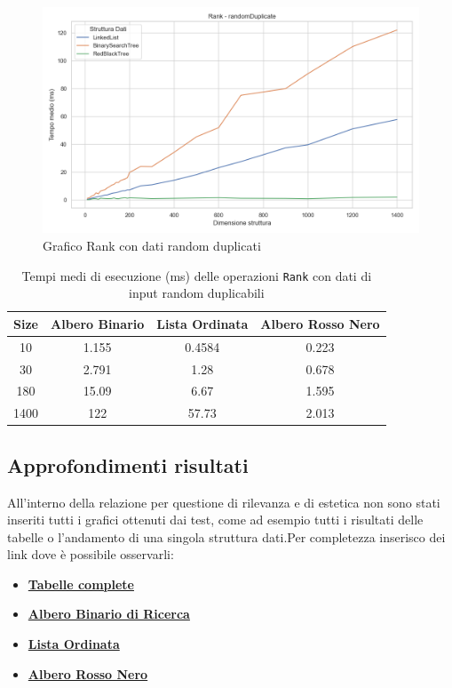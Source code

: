 \documentclass[10pt]{article}
\begin{document}
\begin{figure}
    \centering
    \includegraphics[width=0.8\linewidth]{plots/confronto/randomDuplicate_rank.png}
    \caption{Grafico Rank con dati random duplicati}
    \label{confronto-rank-duplicated}
\end{figure}
\begin{table}[H]
\centering
\begin{tabular}{|c|c|c|c|}
\hline
\textbf{Size} & \textbf{Albero Binario} & \textbf{Lista Ordinata} & \textbf{Albero Rosso Nero} \\
\hline
10     & 1.155 & 0.4584 & 0.223 \\
30     & 2.791 & 1.28  & 0.678 \\
180    & 15.09 & 6.67  & 1.595 \\
1400   & 122 & 57.73  & 2.013 \\
\hline
\end{tabular}
\caption{Tempi medi di esecuzione (ms) delle operazioni \texttt{Rank} con dati di input random duplicabili}
\label{tab:confronto-rank-duplicated}
\end{table}
\subsection{Approfondimenti risultati}
\label{approfondimenti}
All'interno della relazione per questione di rilevanza e di estetica non sono stati inseriti tutti i grafici ottenuti dai test, come ad esempio tutti i risultati delle tabelle o l'andamento di una singola struttura dati.\newline Per completezza inserisco dei link dove è possibile osservarli:
\begin{itemize}
    \item \href{https://github.com/Pennelli02/SelectRankValutation/tree/master/output/plots/table}{\textbf{Tabelle complete}}
    \item \href{https://github.com/Pennelli02/SelectRankValutation/tree/master/output/plots/BinarySearchTree}{\textbf{Albero Binario di Ricerca}}
    \item \href{https://github.com/Pennelli02/SelectRankValutation/tree/master/output/plots/LinkedList}{\textbf{Lista Ordinata}}
    \item \href{https://github.com/Pennelli02/SelectRankValutation/tree/master/output/plots/RedBlackTree}{\textbf{Albero Rosso Nero}}
\end{itemize}
\end{document}
